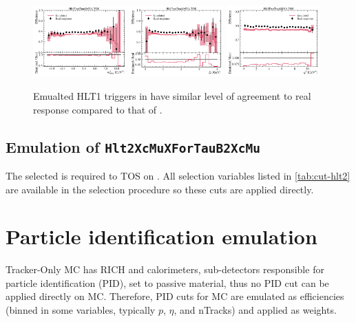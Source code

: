\begin{figure}[ht]
    \includegraphics[width=0.32\textwidth]{
        ./figs-mc-emulation/emulate-hlt1/b0_Hlt1TwoTrackMVA_TOS_mmiss2.pdf
    }
    \includegraphics[width=0.32\textwidth]{
        ./figs-mc-emulation/emulate-hlt1/b0_Hlt1TwoTrackMVA_TOS_el.pdf
    }
    \includegraphics[width=0.32\textwidth]{
        ./figs-mc-emulation/emulate-hlt1/b0_Hlt1TwoTrackMVA_TOS_q2.pdf
    }

    \caption{
        Emualted HLT1 triggers in \Bz have similar level of agreement to real
        response compared to that of \Bp.
    }
    \label{fig:hlt1-twotrackmva-emu}
\end{figure}


\subsection{Emulation of \texttt{Hlt2XcMuXForTauB2XcMu}}

The selected \B is required to TOS on .
All selection variables listed in \cref{tab:cut-hlt2} are available in the
selection procedure so these cuts are applied directly.


\section{Particle identification emulation}
\label{ref:mc-emulation:pid}

Tracker-Only MC has RICH and calorimeters, sub-detectors responsible for
particle identification (PID), set to passive material, thus no PID cut can be
applied directly on MC.
Therefore, PID cuts for MC are emulated as efficiencies (binned in some
variables, typically $p$, $\eta$, and nTracks) and applied as weights.

